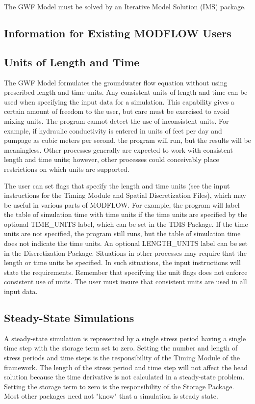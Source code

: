 The GWF Model must be solved by an Iterative Model Solution (IMS) package.

\subsection{Information for Existing MODFLOW Users}


\subsection{Units of Length and Time}
The GWF Model formulates the groundwater flow equation without using prescribed length and time units. Any consistent units of length and time can be used when specifying the input data for a simulation. This capability gives a certain amount of freedom to the user, but care must be exercised to avoid mixing units.  The program cannot detect the use of inconsistent units.  For example, if hydraulic conductivity is entered in units of feet per day and pumpage as cubic meters per second, the program will run, but the results will be meaningless. Other processes generally are expected to work with consistent length and time units; however, other processes could conceivably place restrictions on which units are supported.

The user can set flags that specify the length and time units (see the input instructions for the Timing Module and Spatial Discretization Files), which may be useful in various parts of MODFLOW.  For example, the program will label the table of simulation time with time units if the time units are specified by the optional TIME\_UNITS label, which can be set in the TDIS Package.  If the time units are not specified, the program still runs, but the table of simulation time does not indicate the time units. An optional LENGTH\_UNITS label can be set in the Discretization Package. Situations in other processes may require that the length or time units be specified.  In such situations, the input instructions will state the requirements. Remember that specifying the unit flags does not enforce consistent use of units.  The user must insure that consistent units are used in all input data.

\subsection{Steady-State Simulations}
A steady-state simulation is represented by a single stress period having a single time step with the storage term set to zero. Setting the number and length of stress periods and time steps is the responsibility of the Timing Module of the \mf framework. The length of the stress period and time step will not affect the head solution because the time derivative is not calculated in a steady-state problem. Setting the storage term to zero is the responsibility of the Storage Package. Most other packages need not "know" that a simulation is steady state.

